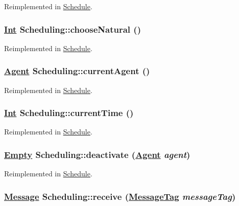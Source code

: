 Reimplemented in \hyperlink{classSchedule_a2}{Schedule}.\hypertarget{interfaceScheduling_a6}{
\subsubsection[chooseNatural]{\setlength{\rightskip}{0pt plus 5cm}\hyperlink{interfaceInt}{Int} Scheduling::choose\-Natural ()}}
\label{interfaceScheduling_a6}




Reimplemented in \hyperlink{classSchedule_a6}{Schedule}.\hypertarget{interfaceScheduling_a4}{
\subsubsection[currentAgent]{\setlength{\rightskip}{0pt plus 5cm}\hyperlink{interfaceAgent}{Agent} Scheduling::current\-Agent ()}}
\label{interfaceScheduling_a4}




Reimplemented in \hyperlink{classSchedule_a4}{Schedule}.\hypertarget{interfaceScheduling_a5}{
\subsubsection[currentTime]{\setlength{\rightskip}{0pt plus 5cm}\hyperlink{interfaceInt}{Int} Scheduling::current\-Time ()}}
\label{interfaceScheduling_a5}




Reimplemented in \hyperlink{classSchedule_a5}{Schedule}.\hypertarget{interfaceScheduling_a3}{
\subsubsection[deactivate]{\setlength{\rightskip}{0pt plus 5cm}\hyperlink{interfaceEmpty}{Empty} Scheduling::deactivate (\hyperlink{interfaceAgent}{Agent} {\em agent})}}
\label{interfaceScheduling_a3}




Reimplemented in \hyperlink{classSchedule_a3}{Schedule}.\hypertarget{interfaceScheduling_a1}{
\subsubsection[receive]{\setlength{\rightskip}{0pt plus 5cm}\hyperlink{interfaceMessage}{Message} Scheduling::receive (\hyperlink{interfaceMessageTag}{Message\-Tag} {\em message\-Tag})}}
\label{interfaceScheduling_a1}




